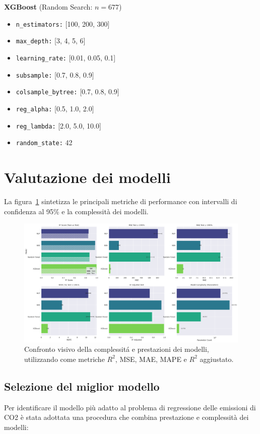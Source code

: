 \documentclass[a4paper,12pt]{report}
\begin{document}
	\smallskip
	\noindent\textbf{XGBoost} \quad (Random Search: $n=677$)
	\begin{itemize}
		\item \texttt{n\_estimators:} [100, 200, 300]
		\item \texttt{max\_depth:} [3, 4, 5, 6]
		\item \texttt{learning\_rate:} [0.01, 0.05, 0.1]
		\item \texttt{subsample:} [0.7, 0.8, 0.9]
		\item \texttt{colsample\_bytree:} [0.7, 0.8, 0.9]
		\item \texttt{reg\_alpha:} [0.5, 1.0, 2.0]
		\item \texttt{reg\_lambda:} [2.0, 5.0, 10.0]
		\item \texttt{random\_state:} 42
	\end{itemize}
	
	\section{Valutazione dei modelli}
	
	La figura~\ref{fig:comparison_models} sintetizza le principali metriche di performance con intervalli di confidenza al 95\% e la complessità dei modelli.
	
	\begin{figure}[H]
		\centering
		\includegraphics[width=1.0\textwidth]{img/comparison_car.png}
		\caption{Confronto visivo della complessitá e prestazioni dei modelli, utilizzando come metriche $R^2$, MSE, MAE, MAPE e $R^2$ aggiustato.}
		\label{fig:comparison_models}
	\end{figure}
	
	\subsection{Selezione del miglior modello}
	Per identificare il modello più adatto al problema di regressione delle emissioni di CO2 è stata adottata una procedura che combina prestazione e complessità dei modelli:
	
\end{document}
